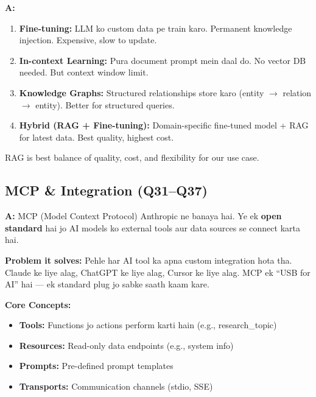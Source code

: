 \documentclass[12pt, a4paper]{article}
\begin{document}
\begin{interviewbox}[title={\faIcon{user-tie} ~Q30: RAG ke alternatives kya hain?}]
\textbf{A:}
\begin{enumerate}
\item \textbf{Fine-tuning:} LLM ko custom data pe train karo. Permanent knowledge injection. Expensive, slow to update.
\item \textbf{In-context Learning:} Pura document prompt mein daal do. No vector DB needed. But context window limit.
\item \textbf{Knowledge Graphs:} Structured relationships store karo (entity $\rightarrow$ relation $\rightarrow$ entity). Better for structured queries.
\item \textbf{Hybrid (RAG + Fine-tuning):} Domain-specific fine-tuned model + RAG for latest data. Best quality, highest cost.
\end{enumerate}

RAG is best balance of quality, cost, and flexibility for our use case.
\end{interviewbox}

\subsection{MCP \& Integration (Q31--Q37)}

\begin{interviewbox}[title={\faIcon{user-tie} ~Q31: MCP Protocol kya hai aur kyun zaroori hai?}]
\textbf{A:} MCP (Model Context Protocol) Anthropic ne banaya hai. Ye ek \textbf{open standard} hai jo AI models ko external tools aur data sources se connect karta hai.

\textbf{Problem it solves:} Pehle har AI tool ka apna custom integration hota tha. Claude ke liye alag, ChatGPT ke liye alag, Cursor ke liye alag. MCP ek ``USB for AI'' hai --- ek standard plug jo sabke saath kaam kare.

\textbf{Core Concepts:}
\begin{itemize}
\item \textbf{Tools:} Functions jo actions perform karti hain (e.g., research\_topic)
\item \textbf{Resources:} Read-only data endpoints (e.g., system info)
\item \textbf{Prompts:} Pre-defined prompt templates
\item \textbf{Transports:} Communication channels (stdio, SSE)
\end{itemize}
\end{interviewbox}
\end{document}
